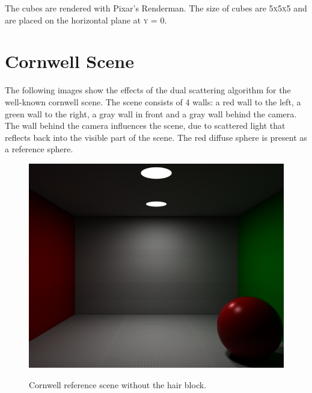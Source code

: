 \documentclass[11pt,a4paper]{report}
\begin{document}
The cubes are rendered with Pixar's Renderman. The size of cubes are \textsc{5x5x5} and are placed on the horizontal plane at \textsc{y = 0}.


\section{Cornwell Scene}

The following images show the effects of the dual scattering algorithm for the well-known cornwell scene. The scene consists of 4 walls: a red wall to the left, a green wall to the right, a gray wall in front and a gray wall behind the camera. The wall behind the camera influences the scene, due to scattered light that reflects back into the visible part of the scene. The red diffuse sphere is present as a reference sphere.

\begin{figure}[h]
\begin{center}
\includegraphics[scale=0.35]{images/scenes/cornwell_empty.jpg}
\label{cornwell_empty}
\caption{Cornwell reference scene without the hair block.}
\end{center}
\end{figure}
\end{document}
